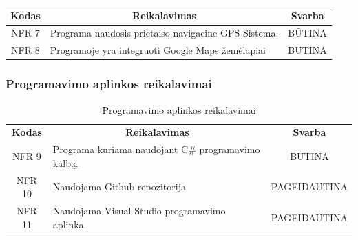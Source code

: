 \documentclass{VUMIFPSkursinis}
\begin{document}
{{{{{\begin{center}
\begin{table}[H]
\begin{tabular}{|p{2cm}|p{}|p{}|}
	\hline
		\multicolumn{1}{|c|}{{\bfseries Kodas}}&
		\multicolumn{1}{|c|}{{\bfseries Reikalavimas}}&
		\multicolumn{1}{|c|}{{\bfseries Svarba}}\\
	\hline 	
		\multicolumn{1}{|c|}{NFR 7}&
		{Programa naudosis prietaiso navigacine GPS Sistema.}&
		\multicolumn{1}{|c|}{BŪTINA}\\	
	
	\hline 	
		\multicolumn{1}{|c|}{NFR 8}&
		{Programoje yra integruoti Google Maps žemėlapiai}&
		\multicolumn{1}{|c|}{BŪTINA}\\	
	
	\hline 	 	 	
	\end{tabular}
	
	\label{table:Sąveikossukitomisprogramomisreikalavimai}
	\end{table}

\end{center}

\subsubsection{Programavimo aplinkos reikalavimai}

\begin{center}
	\begin{table}[H]
	\caption{Programavimo aplinkos reikalavimai}
	\begin{tabular}{|p{2cm}|p{}|p{}|}
	\hline
	    \rowcolor{lightgray}
		\multicolumn{3}{|c|}{Programavimo aplinkos reikalavimai}\\
		
	\hline
		\multicolumn{1}{|c|}{{\bfseries Kodas}}&
		\multicolumn{1}{|c|}{{\bfseries Reikalavimas}}&
		\multicolumn{1}{|c|}{{\bfseries Svarba}}\\
	\hline 	
		\multicolumn{1}{|c|}{NFR 9}&
		{Programa kuriama naudojant C\# programavimo kalbą.}&
		\multicolumn{1}{|c|}{BŪTINA}\\	
	
	\hline 	
		\multicolumn{1}{|c|}{NFR 10}&
		{Naudojama Github repozitorija }&
		\multicolumn{1}{|p{1.5cm}|}{PAGEIDAUTINA}\\		
	
	\hline 	
		\multicolumn{1}{|c|}{NFR 11}&
		{Naudojama Visual Studio programavimo aplinka.}&
		\multicolumn{1}{|p{1.5cm}|}{PAGEIDAUTINA}\\		
	
	\hline 	 	 	
	\end{tabular}
	
	\label{table:Programavimoaplinkosreikalavimai}
	\end{table}


\end{center}}}}}}
\end{document}
